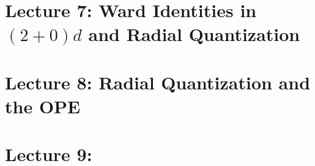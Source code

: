 \documentclass[10pt]{article}
\begin{document}
\clearpage

\section*{Lecture 7: Ward Identities in $(2+0)d$ and Radial Quantization}
\label{sec: lec7}



\clearpage

\section*{Lecture 8: Radial Quantization and the OPE}
\label{sec: lec8}



\clearpage

\section*{Lecture 9: }
\label{sec: lec9}

%

\end{document}
